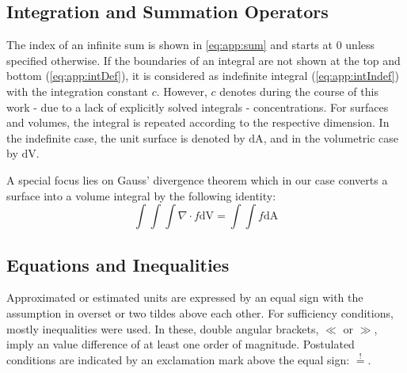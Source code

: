 \subsection{Integration and Summation Operators}
The index of an infinite sum is shown in \cref{eq:app:sum}  and starts at \num{0} unless specified otherwise. If the boundaries of an integral are not shown at the top and bottom (\cref{eq:app:intDef}), it is considered as indefinite integral (\cref{eq:app:intIndef}) with the integration constant $c$. However, $c$ denotes during the course of this work - due to a lack of explicitly solved integrals - concentrations.
For surfaces and volumes, the integral is repeated according to the respective dimension. In the indefinite case, the unit surface is denoted by $\text{dA}$, and in the volumetric case by $\text{dV}$. 

A special focus lies on Gauss' divergence theorem which in our case converts a surface into a volume integral by the following identity:
\begin{equation}
	\int\int\int \nabla\cdot f \mathrm{dV} = \int\int f \mathrm{dA} \label{eq:Gauss}
\end{equation}

\subsection{Equations and Inequalities}
Approximated or estimated units are expressed by an equal sign with the assumption in overset or two tildes above each other. For sufficiency conditions, mostly inequalities were used. In these, double angular brackets, $\ll$ or $\gg$, imply an value difference of at least one order of magnitude. Postulated conditions are indicated by an exclamation mark above the equal sign: $\overset{!}{=}$.

\clearpage

